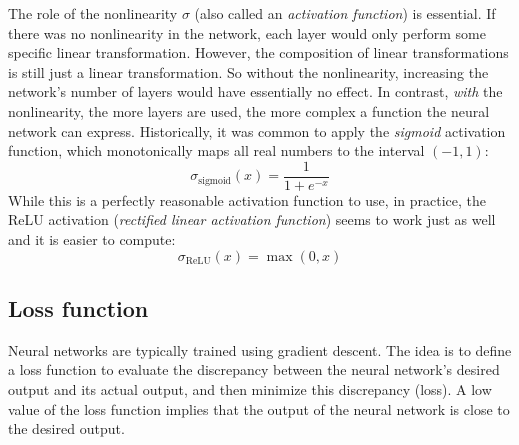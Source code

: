 \documentclass[12pt]{article}
\begin{document}
The role of the nonlinearity $\sigma$ (also called an \textit{activation function}) is essential. If there was no nonlinearity in the network, each layer would only perform some specific linear transformation. However, the composition of linear transformations is still just a linear transformation. So without the nonlinearity, increasing the network's number of layers would have essentially no effect. In contrast, \textit{with} the nonlinearity, the more layers are used, the more complex a function the neural network can express. Historically, it was common to apply the \textit{sigmoid} activation function, which monotonically maps all real numbers to the interval $(-1, 1)$:
\begin{equation}
\sigma_{\textrm{sigmoid}}(x) = \frac{1}{1 + e^{-x}}
\end{equation}
While this is a perfectly reasonable activation function to use, in practice, the ReLU activation (\textit{rectified linear activation function}) seems to work just as well and it is easier to compute:
\begin{equation}
\sigma_{\textrm{ReLU}}(x) = \max(0, x)
\end{equation}
\subsection{Loss function}
\label{sec_loss_fn}

Neural networks are typically trained using gradient descent. The idea is to define a loss function to evaluate the discrepancy between the neural network's desired output and its actual output, and then minimize this discrepancy (loss). A low value of the loss function implies that the output of the neural network is close to the desired output.
\end{document}
